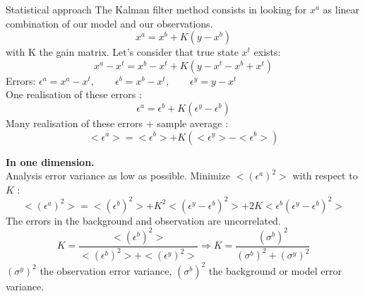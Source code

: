    \begin{frame}[allowframebreaks]{Statistical approach}
       The Kalman filter method consists in looking for $x^a$ as linear combination of our model and our observations.
       \begin{equation}
           x^a=x^b+K(y-x^b)
           \label{eq1}
       \end{equation}
       with K the gain matrix.
       \newline Let’s consider that true state $x^t$ exists:
       \begin{equation}
           x^a-x^t=x^b-x^t+K(y-x^t-x^b+x^t)
       \end{equation}
       Errors: \qquad $\epsilon^a=x^a-x^t,\qquad \epsilon^b=x^b-x^t, \qquad \epsilon^y=y-x^t$ \\
       One realisation of these errors :
       \begin{equation}
           \epsilon^a=\epsilon^b+K(\epsilon^y-\epsilon^b)
       \end{equation}
       Many realisation of these errors + sample average :
       \begin{equation}
           <\epsilon^a>=<\epsilon^b>+K(<\epsilon^y>-<\epsilon^b>)
       \end{equation}

       \textbf{In one dimension.} \\
       Analysis error variance as low as possible.
       \newline Minimize $<(\epsilon^a)^2>$ with respect to $K$ :
       $$<(\epsilon^a)^2>=<(\epsilon^b)^2>+K^2<(\epsilon^y-\epsilon^b)^2>+2K<\epsilon^b(\epsilon^y-\epsilon^b)^2>$$
       The errors in the background and observation are uncorrelated.
       $$K=\frac{<(\epsilon^b)^2>}{<(\epsilon^b)^2>+<(\epsilon^y)^2>} \Rightarrow K=\frac{(\sigma^b)^2}{(\sigma^b)^2+(\sigma^y)^2} $$
       $(\sigma^y)^2$ the observation error variance, \newline $(\sigma^b)^2$ the background or model error variance.
   
	\end{frame}
       
